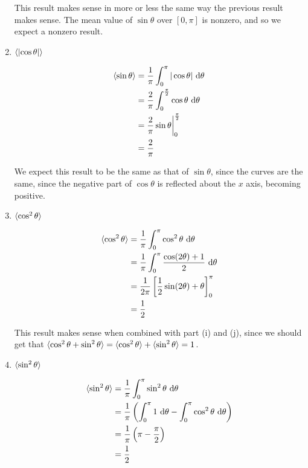 \documentclass{article}
\begin{document}
\begin{enumerate}[label=(\alph*)]
\begin{solution}
        This result makes sense in more or less the same way the previous result makes sense. The mean value of $\sin \theta$ over $[0, \pi]$ is nonzero, and so we expect a nonzero result.
    \end{solution}


    \item $\langle \left|\cos \theta\right| \rangle$
    
    \begin{solution}
        \begin{align*}
            \langle \sin \theta \rangle &= \frac{1}{\pi} \int_0^\pi |\cos \theta| \ \mathrm d \theta\\
            &= \frac{2}{\pi} \int_0^{\frac{\pi}{2}}\cos \theta \ \mathrm d \theta\\
            &= \frac{2}{\pi} \sin \theta \bigg|_0^\frac{\pi}{2}\\
            &= \frac{2}{\pi}
        \end{align*}

        We expect this result to be the same as that of $\sin \theta$, since the curves are the same, since the negative part of $\cos \theta$ is reflected about the $x$ axis, becoming positive.
    \end{solution}

    \item $\langle \cos^2 \theta \rangle$
    
    \begin{solution}
        \begin{align*}
            \langle \cos^2 \theta \rangle &= \frac{1}{\pi} \int_0^\pi \cos^2 \theta \ \mathrm d \theta\\
            &= \frac{1}{\pi} \int_0^\pi \frac{\cos(2\theta)+1}{2} \ \mathrm d \theta \\
            &= \frac{1}{2\pi}\left[\frac{1}{2} \sin (2\theta) + \theta\right]_0^\pi\\
            &= \frac{1}{2}
        \end{align*}

        This result makes sense when combined with part (i) and (j), since we should get that $\langle \cos^2 \theta + \sin^2 \theta \rangle = \langle \cos^2 \theta \rangle + \langle \sin^2 \theta \rangle = 1$.
    \end{solution}

    \item $\langle \sin^2 \theta \rangle$
    
    \begin{solution}
        \begin{align*}
            \langle \sin^2 \theta \rangle &= \frac{1}{\pi} \int_0^\pi \sin^2 \theta \ \mathrm d \theta\\
            &= \frac{1}{\pi} \left(\int_0^\pi 1 \ \mathrm d \theta - \int_0^\pi \cos^2\theta \ \mathrm d \theta \right)\\
            &= \frac{1}{\pi} \left(\pi - \frac{\pi}{2}\right)\\
            &= \frac{1}{2}
        \end{align*}


\end{solution}
\end{enumerate}
\end{document}
